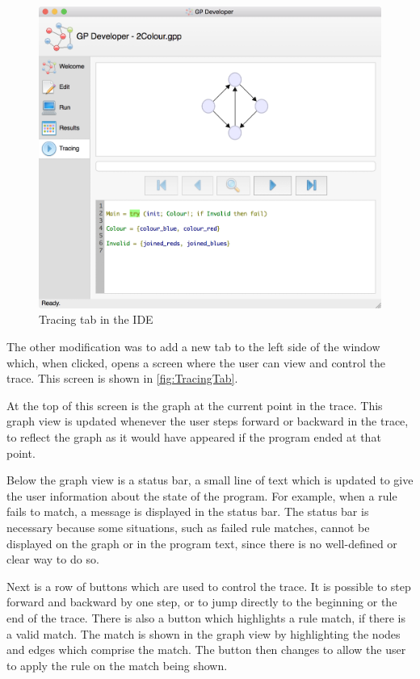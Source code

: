 \documentclass[authoryearcitations]{UoYCSproject}
\newenvironment{nscenter}
    {\parskip=0pt\par\nopagebreak\centering}
    {\par\noindent\ignorespacesafterend}
\begin{document}
\begin{figure}[!htb]
    \begin{nscenter}
        \includegraphics[width=\textwidth]{TracingTab}
    \end{nscenter}
    \caption{Tracing tab in the IDE}
    \label{fig:TracingTab}
\end{figure}

The other modification was to add a new tab to the left side of the window
which, when clicked, opens a screen where the user can view and control the trace.
This screen is shown in \autoref{fig:TracingTab}.

At the top of this screen is the graph at the current point in the trace. This
graph view is updated whenever the user steps forward or backward in the trace,
to reflect the graph as it would have appeared if the program ended at that point.

Below the graph view is a status bar, a small line of text which is updated to
give the user information about the state of the program. For example, when a rule
fails to match, a message is displayed in the status bar. The status bar is necessary
because some situations, such as failed rule matches, cannot be displayed on the graph
or in the program text, since there is no well-defined or clear way to do so.

Next is a row of buttons which are used to control the trace. It is possible to
step forward and backward by one step, or to jump directly to the beginning or the
end of the trace. There is also a button which highlights a rule match, if there
is a valid match. The match is shown in the graph view by highlighting the nodes
and edges which comprise the match. The button then changes to allow the user to
apply the rule on the match being shown.
\end{document}
